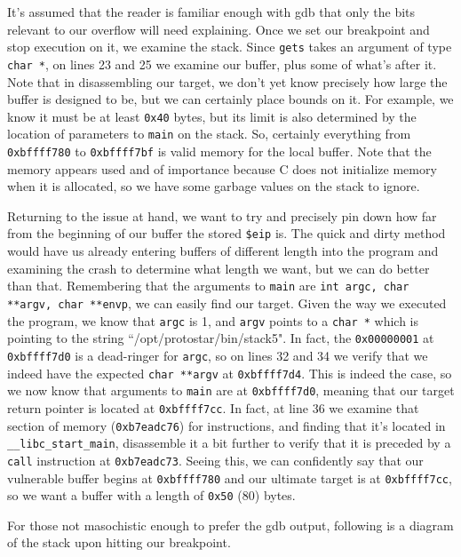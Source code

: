 It's assumed that the reader is familiar enough with gdb that only the bits relevant to our overflow
will need explaining. Once we set our breakpoint and stop execution on it, we examine the stack.
Since \texttt{gets} takes an argument of type \texttt{char *}, on lines 23 and 25 we examine our buffer, 
plus some of what's after it. Note that in disassembling our target, we don't yet know precisely
how large the buffer is designed to be, but we can certainly place bounds on it. For example,
we know it must be at least \texttt{0x40} bytes, but its limit is also determined by the
location of parameters to \texttt{main} on the stack. So, certainly everything 
from \texttt{0xbffff780} to \texttt{0xbffff7bf} is valid memory for the local buffer. Note that
the memory appears used and of importance because C does not initialize memory when it is allocated,
so we have some garbage values on the stack to ignore.

Returning to the issue at hand, we want to try and precisely pin down how far from the beginning of our
buffer the stored \texttt{\$eip} is. The quick and dirty method would have us already entering
buffers of different length into the program and examining the crash to determine what length
we want, but we can do better than that. Remembering that the arguments to \texttt{main}
are \texttt{int argc, char **argv, char **envp}, we can easily find our target. Given the
way we executed the program, we know that \texttt{argc} is 1, and \texttt{argv} points to a
\texttt{char *} which is pointing to the string ``/opt/protostar/bin/stack5". In fact, the
\texttt{0x00000001} at \texttt{0xbffff7d0} is a dead-ringer for \texttt{argc}, so on lines
32 and 34 we verify that we indeed have the expected \texttt{char **argv} at \texttt{0xbffff7d4}.
This is indeed the case, so we now know that arguments to \texttt{main} are at \texttt{0xbffff7d0},
meaning that our target return pointer is located at \texttt{0xbffff7cc}. In fact, at line 36
we examine that section of memory (\texttt{0xb7eadc76}) for instructions, and finding that it's located
in \texttt{\_\_libc\_start\_main}, disassemble it a bit further to verify that it is preceded by a 
\texttt{call} instruction at \texttt{0xb7eadc73}. Seeing this, we can confidently say that
our vulnerable buffer begins at \texttt{0xbffff780} and our ultimate target is at \texttt{0xbffff7cc},
so we want a buffer with a length of \texttt{0x50} (80) bytes.

For those not masochistic enough to prefer the gdb output, following is a diagram of the stack upon hitting
our breakpoint.


